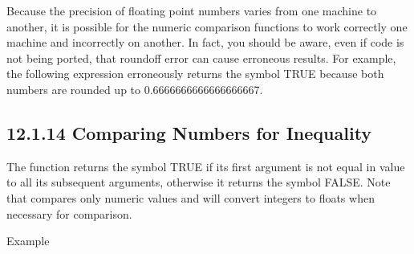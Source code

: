 \documentclass[letterpaper,10pt,english]{sphinxmanual}
\begin{document}
Because the precision of floating point numbers varies from one machine
to another, it is possible for the numeric comparison functions to work
correctly one machine and incorrectly on another. In fact, you should be
aware, even if code is not being ported, that roundoff error can cause
erroneous results. For example, the following expression erroneously
returns the symbol TRUE because both numbers are rounded up to
0.6666666666666666667.

\begin{sphinxVerbatim}[commandchars=\\\{\}]
   
\end{sphinxVerbatim}


\subsection{12.1.14 Comparing Numbers for Inequality}
\label{\detokenize{actions:comparing-numbers-for-inequality}}
The \sphinxstylestrong{\textless{}\textgreater{}} function returns the symbol TRUE if its first argument is not
equal in value to all its subsequent arguments, otherwise it returns the
symbol FALSE. Note that \sphinxstylestrong{\textless{}\textgreater{}} compares only numeric values and will
convert integers to floats when necessary for comparison.


\begin{sphinxVerbatim}[commandchars=\\\{\}]
  
\end{sphinxVerbatim}

Example

\begin{sphinxVerbatim}[commandchars=\\\{\}]
   
   
\end{sphinxVerbatim}
\end{document}
